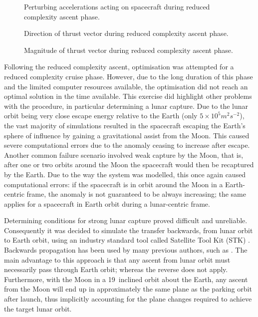 \begin{figure}
\centering
\def\svgwidth{\figurewidth}

\caption{Perturbing accelerations acting on spacecraft during reduced complexity ascent phase.}
\label{fig:Ascent2-pert2}
\end{figure}

\begin{figure}
\centering
\def\svgwidth{\figurewidth}

\caption{Direction of thrust vector during reduced complexity ascent phase.}
\label{fig:Ascent2-thrust}
\end{figure}

\begin{figure}
\centering
\def\svgwidth{\figurewidth}

\caption{Magnitude of thrust vector during reduced complexity ascent phase.}
\label{fig:Ascent2-thrustM}
\end{figure}



Following the reduced complexity ascent, optimisation was attempted for a reduced complexity cruise phase. However, due to the long duration of this phase and the limited computer resources available, the optimisation did not reach an optimal solution in the time available. This exercise did highlight other problems with the procedure, in particular determining a lunar capture. Due to the lunar orbit being very close escape energy relative to the Earth (only $5\times10^5 m^2s^{-2}$), the vast majority of simulations resulted in the spacecraft escaping the Earth's sphere of influence by gaining a gravitational assist from the Moon. This caused severe computational errors due to the anomaly ceasing to increase after escape. Another common failure scenario involved weak capture by the Moon, that is, after one or two orbits around the Moon the spacecraft would then be recaptured by the Earth. Due to the way the system was modelled, this once again caused computational errors: if the spacecraft is in orbit around the Moon in a Earth-centric frame, the anomaly is not guaranteed to be always increasing; the same applies for a spacecraft in Earth orbit during a lunar-centric frame.

Determining conditions for strong lunar capture proved difficult and unreliable. Consequently it was decided to simulate the transfer backwards, from lunar orbit to Earth orbit, using an industry standard tool called Satellite Tool Kit (STK) \parencite{STK}. Backwards propagation has been used by many previous authors, such as \textcite{Author}. The main advantage to this approach is that any ascent from lunar orbit must necessarily pass through Earth orbit; whereas the reverse does not apply. Furthermore, with the Moon in a 19\degrees\ inclined orbit about the Earth, any ascent from the Moon will end up in approximately the same plane as the parking orbit after launch, thus implicitly accounting for the plane changes required to achieve the target lunar orbit.

